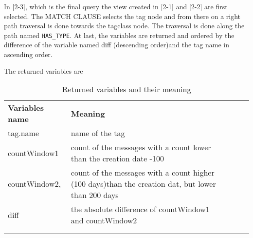 In \ref{2-3}, which is the final query the view created in \ref{2-1} and \ref{2-2} are first selected.
The MATCH CLAUSE selects the tag node and from there on a right path traversal is done towards the
tagclass node. The traversal is done along the path named  \texttt{HAS\_TYPE}. 
At last, the variables are returned and ordered by the difference of the variable named diff (descending order)and the tag name in ascending order.

The returned variables are 

\begin{table}[!ht]
\begin{tabular}{lllll}
\cline{1-2}
\multicolumn{1}{|l|}{\textbf{Variables name}} & \multicolumn{1}{l|}{\textbf{Meaning}}                                                                                  &  &  &  \\ \cline{1-2}
\multicolumn{1}{|l|}{tag.name}                & \multicolumn{1}{l|}{name of the tag}                                                                                   &  &  &  \\ \cline{1-2}
\multicolumn{1}{|l|}{countWindow1}            & \multicolumn{1}{l|}{count of the messages with a count lower than the creation date -100}                              &  &  &  \\ \cline{1-2}
\multicolumn{1}{|l|}{countWindow2,}           & \multicolumn{1}{l|}{count of the messages with a count higher (100 days)than the creation dat,
but lower than 200 days} &  &  &  \\ \cline{1-2}
\multicolumn{1}{|l|}{diff}                    & \multicolumn{1}{l|}{the absolute difference of countWindow1 and countWindow2}                                          &  &  &  \\ \cline{1-2}
                                              &                                                                                                                        &  &  &  \\
                                              &                                                                                                                        &  &  & 
\end{tabular}
\caption{Returned variables and their meaning}
\label{RetCypher2BITable}
\end{table}
